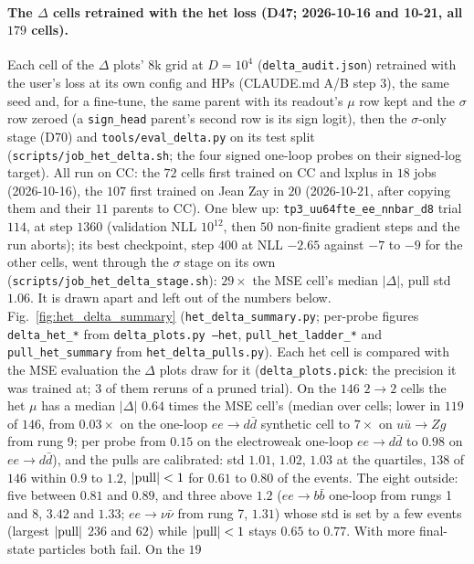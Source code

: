 \documentclass[11pt]{article}
\newcommand{\code}[1]{\texttt{#1}}
\begin{document}
\paragraph{The $\Delta$ cells retrained with the het loss (D47; 2026-10-16 and 10-21, all $179$ cells).} Each cell of the
$\Delta$ plots' $8$k grid at $D=10^4$ (\code{delta\_audit.json}) retrained with the user's loss at its own config and
HPs (CLAUDE.md A/B step 3), the same seed and, for a fine-tune, the same parent with its readout's $\mu$ row kept and the
$\sigma$ row zeroed (a \code{sign\_head} parent's second row is its sign logit), then the $\sigma$-only stage (D70) and
\code{tools/eval\_delta.py} on its test split (\code{scripts/job\_het\_delta.sh}; the four signed one-loop probes on
their signed-log target). All run on CC: the $72$ cells first trained on CC and lxplus in $18$ jobs (2026-10-16), the
$107$ first trained on Jean Zay in $20$ (2026-10-21, after copying them and their $11$ parents to CC). One blew up:
\code{tp3\_uu64fte\_ee\_nnbar\_d8} trial $114$, at step $1360$ (validation NLL $10^{12}$, then $50$ non-finite gradient
steps and the run aborts); its best checkpoint, step $400$ at NLL $-2.65$ against $-7$ to $-9$ for the other cells, went
through the $\sigma$ stage on its own (\code{scripts/job\_het\_delta\_stage.sh}): $29\times$ the MSE cell's median
$|\Delta|$, pull std $1.06$. It is drawn apart and left out of the numbers below. Fig.~\ref{fig:het_delta_summary}
(\code{het\_delta\_summary.py}; per-probe figures \code{delta\_het\_*} from \code{delta\_plots.py --het},
\code{pull\_het\_ladder\_*} and \code{pull\_het\_summary} from \code{het\_delta\_pulls.py}). Each het cell is compared with the MSE evaluation the $\Delta$ plots draw for it (\code{delta\_plots.pick}: the
precision it was trained at; $3$ of them reruns of a pruned trial). On the $146$ $2\to2$ cells the het $\mu$ has a
median $|\Delta|$ $0.64$ times the MSE cell's (median over cells; lower in $119$ of $146$, from $0.03\times$ on the
one-loop $ee\to d\bar d$ synthetic cell to $7\times$ on $u\bar u\to Zg$ from rung 9; per probe from $0.15$ on the
electroweak one-loop $ee\to d\bar d$ to $0.98$ on $ee\to d\bar d$), and the pulls are calibrated: std $1.01$, $1.02$,
$1.03$ at the quartiles, $138$ of $146$ within $0.9$ to $1.2$, $|{\rm pull}|<1$ for $0.61$ to $0.80$ of the events. The
eight outside: five between $0.81$ and $0.89$, and three above $1.2$ ($ee\to b\bar b$ one-loop from rungs 1 and 8,
$3.42$ and $1.33$; $ee\to\nu\bar\nu$ from rung 7, $1.31$) whose std is set by a few events (largest $|{\rm pull}|$ $236$
and $62$) while $|{\rm pull}|<1$ stays $0.65$ to $0.77$. With more final-state particles both fail. On the $19$
\end{document}
